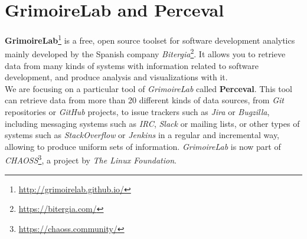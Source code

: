 \documentclass[a4paper, 12pt]{book}
\begin{document}
\section{GrimoireLab and Perceval}
\label{sec:grimoire}
\textbf{GrimoireLab}\footnote{\url{http://grimoirelab.github.io/}} is a free, open source toolset for software development analytics
mainly developed by the Spanish company \emph{Bitergia}\footnote{\url{https://bitergia.com/}}.
It allows you to retrieve data from many kinds of systems with information related to software development, and produce
analysis and visualizations with it.\\
We are focusing on a particular tool of \emph{GrimoireLab} called \textbf{Perceval}. This tool can retrieve data from more
than 20 different kinds of data sources, from \emph{Git} repositories or \emph{GitHub} projects, to issue trackers such as \emph{Jira}
or \emph{Bugzilla}, including messaging systems such as \emph{IRC}, \emph{Slack} or mailing lists, or other types of systems such as
\emph{StackOverflow} or \emph{Jenkins} in a regular and incremental way, allowing to produce uniform sets of information.
\newline \emph{GrimoireLab} is now part of \emph{CHAOSS}\footnote{\url{https://chaoss.community/}}, a project by \emph{The Linux Foundation}.
\cleardoublepage
\end{document}
